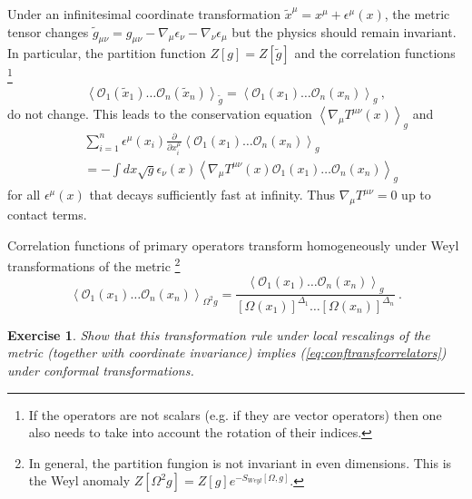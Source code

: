 \documentclass{ws-rv9x6}
\newtheorem{exercise}{Exercise}[section]
\newcommand\be{\begin{equation}}
\newcommand\ee{\end{equation}}
\begin{document}
Under an infinitesimal coordinate transformation $\tilde{x}^{\mu}=x^{\mu}+\epsilon^{\mu}(x)$,
the metric tensor changes $\tilde{g}_{\mu\nu}=g_{\mu\nu}-\nabla_{\mu}\epsilon_{\nu}-\nabla_{\nu}\epsilon_{\mu}$
but the physics should remain invariant. In particular, the partition
function $Z[g]=Z[\tilde{g}]$ and the correlation functions %
\footnote{If the operators are not scalars (e.g. if they are vector operators)
then one also needs to take into account the rotation of their indices.%
}
\be
\left\langle \mathcal{O}_{1}(\tilde{x}_{1})\dots\mathcal{O}_{n}(\tilde{x}_{n})\right\rangle _{\tilde{g}}=\left\langle \mathcal{O}_{1}(x_{1})\dots\mathcal{O}_{n}(x_{n})\right\rangle _{g}\ ,
\ee
do not change.
This leads to the conservation equation $\left\langle \nabla_{\mu}T^{\mu\nu}(x)\right\rangle _{g}$
and 
\begin{align}
&\sum_{i=1}^{n}\epsilon^{\mu}(x_{i})\frac{\partial}{\partial x_{i}^{\mu}}\left\langle \mathcal{O}_{1}(x_{1})\dots\mathcal{O}_{n}(x_{n})\right\rangle _{g} \label{eq:DiffWardIdentity} \\
&=-\int dx\sqrt{g}\epsilon_{\nu}(x)\left\langle \nabla_{\mu}T^{\mu\nu}(x)\mathcal{O}_{1}(x_{1})\dots\mathcal{O}_{n}(x_{n})\right\rangle _{g}\nonumber
\end{align}
for all $\epsilon^{\mu}(x)$ that decays sufficiently fast at infinity.
Thus $\nabla_{\mu}T^{\mu\nu}=0$ up to contact terms.

Correlation functions of primary operators transform homogeneously
under Weyl transformations of the metric %
\footnote{In general, the partition fungion is not invariant in even dimensions.
This is the Weyl anomaly $Z[\Omega^{2}g]=Z[g]e^{-S_{Weyl}[\Omega,g]}$.%
}
\begin{equation}
\left\langle \mathcal{O}_{1}(x_{1})\dots\mathcal{O}_{n}(x_{n})\right\rangle _{\Omega^{2}g}=
\frac{\left\langle \mathcal{O}_{1}(x_{1})\dots\mathcal{O}_{n}(x_{n})\right\rangle _{g}}
{\left[\Omega(x_{1})\right]^{\Delta_{1}}\dots\left[\Omega(x_{n})\right]^{\Delta_{n}}}\ .\label{eq:Weyltransformation}
\end{equation}

\begin{exercise} Show that this transformation rule under local rescalings
of the metric (together with coordinate invariance) implies (\ref{eq:conftransfcorrelators})
under conformal transformations.
\end{exercise}
\end{document}
